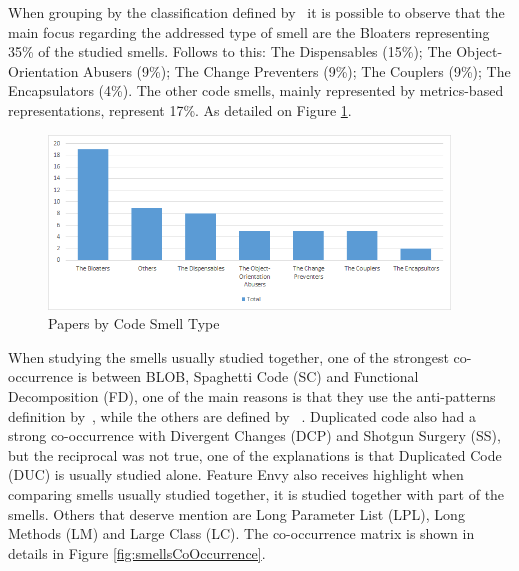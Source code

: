 When grouping by the classification defined by~\cite{mantyla2003bad} it is possible to observe that the main focus regarding the addressed type of smell are the Bloaters representing 35\% of the studied smells. Follows to this: The Dispensables (15\%); The Object-Orientation Abusers (9\%); The Change Preventers (9\%); The Couplers (9\%); The Encapsulators (4\%). The other code smells, mainly represented by metrics-based representations, represent 17\%. As detailed on Figure \ref{fig:papersBySmellType}.


\begin{figure}[!ht] 
    \centering
	\caption{Papers by Code Smell Type}
	\label{fig:papersBySmellType}
	\includegraphics[width=0.95\textwidth]{imagens/papersBySmellType.png}
\end{figure}

%
When studying the smells usually studied together, one of the strongest co-occurrence is between BLOB, Spaghetti Code (SC) and Functional Decomposition (FD), one of the main reasons is that they use the anti-patterns definition  by~\citet{brown1998antipatterns}, while the others are defined by ~\citet{fowler1999refactoring}. Duplicated code also had a strong co-occurrence with Divergent Changes (DCP) and Shotgun Surgery (SS), but the reciprocal was not true, one of the explanations is that Duplicated Code (DUC) is usually studied alone. Feature Envy also receives highlight when comparing smells usually studied together, it is studied together with part of the smells. Others that deserve mention are Long Parameter List (LPL), Long Methods (LM) and Large Class (LC). The co-occurrence matrix is shown in details in Figure \ref{fig:smellsCoOccurrence}.  %

